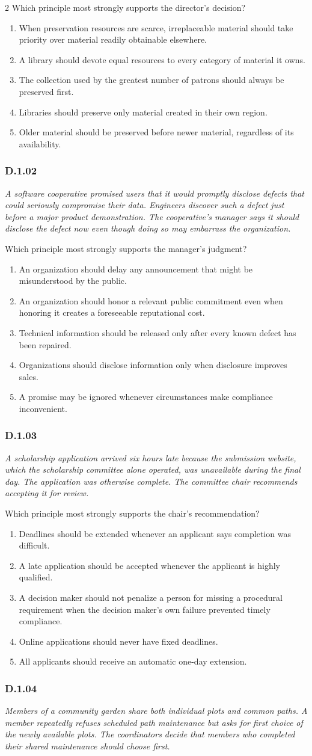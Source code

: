 \documentclass[10pt]{extarticle}
\newcommand{\choice}[1]{\item #1}
\newcommand{\bankitem}[1]{\subsubsection*{#1}}
\begin{document}
\begin{multicols}{2}
Which principle most strongly supports the director's decision?
\begin{enumerate}[label=(\alph*)]
  \choice{When preservation resources are scarce, irreplaceable material should take priority over material readily obtainable elsewhere.}
  \choice{A library should devote equal resources to every category of material it owns.}
  \choice{The collection used by the greatest number of patrons should always be preserved first.}
  \choice{Libraries should preserve only material created in their own region.}
  \choice{Older material should be preserved before newer material, regardless of its availability.}
\end{enumerate}
\bankitem{D.1.02}
\emph{A software cooperative promised users that it would promptly disclose defects that could seriously compromise their data. Engineers discover such a defect just before a major product demonstration. The cooperative's manager says it should disclose the defect now even though doing so may embarrass the organization.}

Which principle most strongly supports the manager's judgment?
\begin{enumerate}[label=(\alph*)]
  \choice{An organization should delay any announcement that might be misunderstood by the public.}
  \choice{An organization should honor a relevant public commitment even when honoring it creates a foreseeable reputational cost.}
  \choice{Technical information should be released only after every known defect has been repaired.}
  \choice{Organizations should disclose information only when disclosure improves sales.}
  \choice{A promise may be ignored whenever circumstances make compliance inconvenient.}
\end{enumerate}
\bankitem{D.1.03}
\emph{A scholarship application arrived six hours late because the submission website, which the scholarship committee alone operated, was unavailable during the final day. The application was otherwise complete. The committee chair recommends accepting it for review.}

Which principle most strongly supports the chair's recommendation?
\begin{enumerate}[label=(\alph*)]
  \choice{Deadlines should be extended whenever an applicant says completion was difficult.}
  \choice{A late application should be accepted whenever the applicant is highly qualified.}
  \choice{A decision maker should not penalize a person for missing a procedural requirement when the decision maker's own failure prevented timely compliance.}
  \choice{Online applications should never have fixed deadlines.}
  \choice{All applicants should receive an automatic one-day extension.}
\end{enumerate}
\bankitem{D.1.04}
\emph{Members of a community garden share both individual plots and common paths. A member repeatedly refuses scheduled path maintenance but asks for first choice of the newly available plots. The coordinators decide that members who completed their shared maintenance should choose first.}


\end{multicols}
\end{document}
